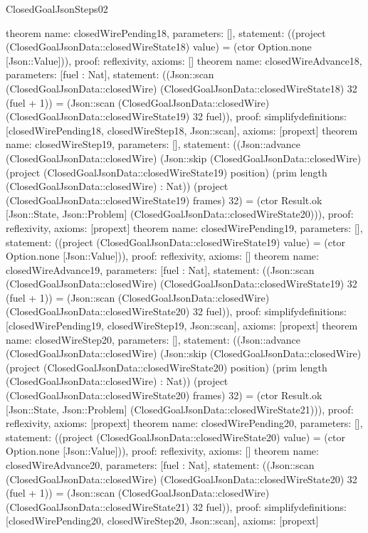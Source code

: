 \begin{lexlean}{ClosedGoalJsonSteps02}
\begin{semanticmodule}
{}
theorem{
 name: closedWirePending18, parameters: [],
 statement: ((project (ClosedGoalJsonData::closedWireState18) value) = (ctor Option.none [Json::Value])), proof: reflexivity{}, axioms: []
}
theorem{
 name: closedWireAdvance18, parameters: [fuel : Nat],
 statement: ((Json::scan (ClosedGoalJsonData::closedWire) (ClosedGoalJsonData::closedWireState18) 32 (fuel + 1)) = (Json::scan (ClosedGoalJsonData::closedWire) (ClosedGoalJsonData::closedWireState19) 32 fuel)), proof: simplify{definitions: [closedWirePending18, closedWireStep18, Json::scan]}, axioms: [propext]
}
theorem{
 name: closedWireStep19, parameters: [],
 statement: ((Json::advance (ClosedGoalJsonData::closedWire) (Json::skip (ClosedGoalJsonData::closedWire) (project (ClosedGoalJsonData::closedWireState19) position) (prim length (ClosedGoalJsonData::closedWire) : Nat)) (project (ClosedGoalJsonData::closedWireState19) frames) 32) = (ctor Result.ok [Json::State, Json::Problem] (ClosedGoalJsonData::closedWireState20))), proof: reflexivity{}, axioms: [propext]
}
theorem{
 name: closedWirePending19, parameters: [],
 statement: ((project (ClosedGoalJsonData::closedWireState19) value) = (ctor Option.none [Json::Value])), proof: reflexivity{}, axioms: []
}
theorem{
 name: closedWireAdvance19, parameters: [fuel : Nat],
 statement: ((Json::scan (ClosedGoalJsonData::closedWire) (ClosedGoalJsonData::closedWireState19) 32 (fuel + 1)) = (Json::scan (ClosedGoalJsonData::closedWire) (ClosedGoalJsonData::closedWireState20) 32 fuel)), proof: simplify{definitions: [closedWirePending19, closedWireStep19, Json::scan]}, axioms: [propext]
}
theorem{
 name: closedWireStep20, parameters: [],
 statement: ((Json::advance (ClosedGoalJsonData::closedWire) (Json::skip (ClosedGoalJsonData::closedWire) (project (ClosedGoalJsonData::closedWireState20) position) (prim length (ClosedGoalJsonData::closedWire) : Nat)) (project (ClosedGoalJsonData::closedWireState20) frames) 32) = (ctor Result.ok [Json::State, Json::Problem] (ClosedGoalJsonData::closedWireState21))), proof: reflexivity{}, axioms: [propext]
}
theorem{
 name: closedWirePending20, parameters: [],
 statement: ((project (ClosedGoalJsonData::closedWireState20) value) = (ctor Option.none [Json::Value])), proof: reflexivity{}, axioms: []
}
theorem{
 name: closedWireAdvance20, parameters: [fuel : Nat],
 statement: ((Json::scan (ClosedGoalJsonData::closedWire) (ClosedGoalJsonData::closedWireState20) 32 (fuel + 1)) = (Json::scan (ClosedGoalJsonData::closedWire) (ClosedGoalJsonData::closedWireState21) 32 fuel)), proof: simplify{definitions: [closedWirePending20, closedWireStep20, Json::scan]}, axioms: [propext]
}
\end{semanticmodule}
\end{lexlean}
